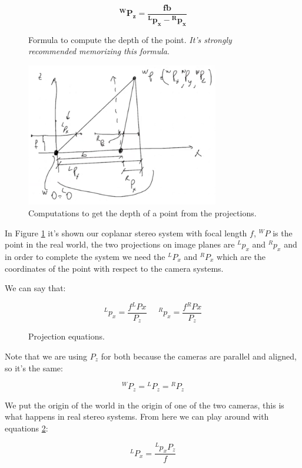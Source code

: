 \begin{figure}[H]
\[
        \bm{{}^WP_z = \frac{fb}{{}^Lp_x-{}^Rp_x}}
\]
\caption{Formula to compute the depth of the point. \textit{It's strongly recommended memorizing this formula}.
}
\end{figure}


\begin{figure}[H]
    \centering
    \includegraphics[width=0.75\textwidth]{Figures/epi_comp.png}
    \caption{Computations to get the depth of a point from the projections.}
    \label{fig:epi_comp}
\end{figure}

In Figure \ref{fig:epi_comp} it's shown our coplanar stereo system with focal length \(f\), \({}^WP\) is the point in the real world, the two projections on image planes are \({}^Lp_x\) and \({}^Rp_x\) and in order to complete the system we need the \({}^LP_x\) and \({}^RP_x\) which are the coordinates of the point with respect to the camera systems. 

We can say that: 

\begin{figure}[H]    
\[
    {}^Lp_x = \frac{f{}^LPx}{P_z}\;\;\;\;\;   
    {}^Rp_x = \frac{f{}^RPx}{P_z}  
\]
\caption{Projection equations.}
\label{eq:proj}
\end{figure}
Note that we are using \(P_z\) for both because the cameras are parallel and aligned, so it's the same:

\[
    {}^WP_z = {}^LP_z = {}^RP_z
\]

We put the origin of the world in the origin of one of the two cameras, this is what happens in real stereo systems. From here we can play around with equations \ref{eq:proj}:

\[
    {}^LP_x = \frac{{}^Lp_xP_z}{f}    
\]

